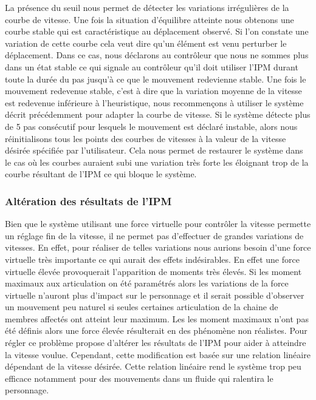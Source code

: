 \documentclass[runningheads,a4paper]{llncs}
\begin{document}
La présence du seuil nous permet de détecter les variations irrégulières de la courbe de vitesse. Une fois la situation d'équilibre atteinte nous obtenons une courbe stable qui est caractéristique au déplacement observé. Si l'on constate une variation de cette courbe cela veut dire qu'un élément est venu perturber le déplacement. Dans ce cas, nous déclarons au contrôleur que nous ne sommes plus dans un état stable ce qui signale au contrôleur qu'il doit utiliser l'IPM durant toute la durée du pas jusqu'à ce que le mouvement redevienne stable. Une fois le mouvement redevenue stable, c'est à dire que la variation moyenne de la vitesse est redevenue inférieure à l'heuristique, nous recommençons à utiliser le système décrit précédemment pour adapter la courbe de vitesse. Si le système détecte plus de 5 pas consécutif pour lesquels le mouvement est déclaré instable, alors nous réinitialisons tous les points des courbes de vitesses à la valeur de la vitesse désirée spécifiée par l'utilisateur. Cela nous permet de restaurer le système dans le cas où les courbes auraient subi une variation très forte les éloignant trop de la courbe résultant de l'IPM ce qui bloque le système.
%
\subsubsection{Altération des résultats de l'IPM}
\label{sec:ipm_alt}
%
Bien que le système utilisant une force virtuelle pour contrôler la vitesse permette un réglage fin de la vitesse, il ne permet pas d'effectuer de grandes variations de vitesses. En effet, pour réaliser de telles variations nous aurions besoin d'une force virtuelle très importante ce qui aurait des effets indésirables. En effet une force virtuelle élevée provoquerait l'apparition de moments très élevés. Si les moment maximaux aux articulation on été  paramétrés alors les variations de la force virtuelle n'auront plus d'impact sur le personnage et il serait possible d'observer un mouvement peu naturel si seules certaines articulation de la chaine de membres affectés ont atteint leur maximum. Les les moment maximaux n'ont pas été définis alors une force élevée résulterait en des phénomène non réalistes. Pour régler ce problème \cite{coros2010generalized} propose d'altérer les résultats de l'IPM pour aider à atteindre la vitesse voulue. Cependant, cette modification est basée sur une relation linéaire dépendant de la vitesse désirée. Cette relation linéaire rend le système trop peu efficace notamment pour des mouvements dans un fluide qui ralentira le personnage.
\end{document}
